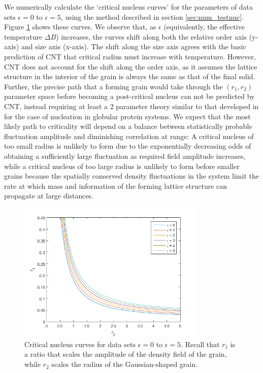 We numerically calculate the `critical nucleus curves' for the parameters of data sets $\epsilon=0$ to $\epsilon=5$, using the method described in section \ref{sec:num_testnuc}. Figure \ref{fig:res_criticality} shows these curves. We observe that, as $\epsilon$ (equivalently, the effective temperature $\Delta B$) increases, the curves shift along both the relative order axis (y-axis) and size axis (x-axis). The shift along the size axis agrees with the basic prediction of CNT that critical radius must increase with temperature. However, CNT does not account for the shift along the order axis, as it assumes the lattice structure in the interior of the grain is always the same as that of the final solid. Further, the precise path that a forming grain would take through the $(r_1,r_2)$ parameter space before becoming a post-critical nucleus can not be predicted by CNT, instead requiring at least a 2 parameter theory similar to that developed in \cite{lutsko15} for the case of nucleation in globular protein systems. We expect that the most likely path to criticality will depend on a balance between statistically probable fluctuation amplitude and diminishing correlation at range: A critical nucleus of too small radius is unlikely to form due to the exponentially decreasing odds of obtaining a sufficiently large fluctuation as required field amplitude increases, while a critical nucleus of too large radius is unlikely to form before smaller grains because the spatially conserved density fluctuations in the system limit the rate at which mass and information of the forming lattice structure can propagate at large distances.

\begin{figure}[h]
	\centering
	\includegraphics[width=0.8\textwidth]{fig_res/res_criticality}
	\caption{Critical nucleus curves for data sets $\epsilon=0$ to $\epsilon=5$. Recall that $r_1$ is a ratio that scales the amplitude of the density field of the grain, while $r_2$ scales the radius of the Gaussian-shaped grain.}\label{fig:res_criticality}
\end{figure}


